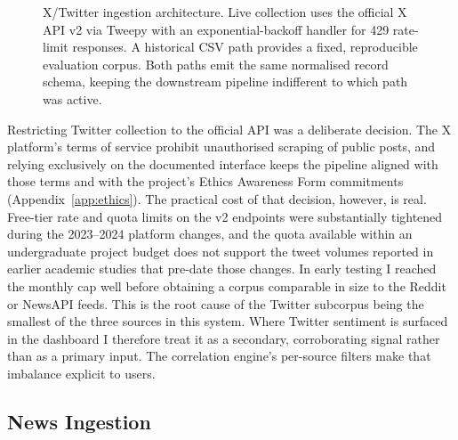 \begin{figure}[H]
\caption{X/Twitter ingestion architecture. Live collection uses the official X API v2 via Tweepy with an exponential-backoff handler for 429 rate-limit responses. A historical CSV path provides a fixed, reproducible evaluation corpus. Both paths emit the same normalised record schema, keeping the downstream pipeline indifferent to which path was active.}
\label{fig:twitter_backend}
\end{figure}

Restricting Twitter collection to the official API was a deliberate decision. The X platform's terms of service prohibit unauthorised scraping of public posts, and relying exclusively on the documented interface keeps the pipeline aligned with those terms and with the project's Ethics Awareness Form commitments (Appendix~\ref{app:ethics}). The practical cost of that decision, however, is real. Free-tier rate and quota limits on the v2 endpoints were substantially tightened during the 2023--2024 platform changes, and the quota available within an undergraduate project budget does not support the tweet volumes reported in earlier academic studies that pre-date those changes. In early testing I reached the monthly cap well before obtaining a corpus comparable in size to the Reddit or NewsAPI feeds. This is the root cause of the Twitter subcorpus being the smallest of the three sources in this system. Where Twitter sentiment is surfaced in the dashboard I therefore treat it as a secondary, corroborating signal rather than as a primary input. The correlation engine's per-source filters make that imbalance explicit to users.

\subsection{News Ingestion}

